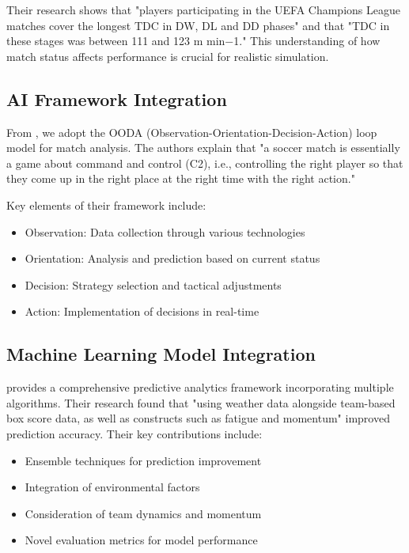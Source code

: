 \documentclass[10pt,journal,compsoc]{IEEEtran}
\begin{document}
Their research shows that "players participating in the UEFA Champions League matches cover the longest TDC in DW, DL and DD phases" and that "TDC in these stages was between 111 and 123 m min−1." This understanding of how match status affects performance is crucial for realistic simulation. 

\subsection{AI Framework Integration}
From \cite{pu2024orientation}, we adopt the OODA (Observation-Orientation-Decision-Action) loop model for match analysis. The authors explain that "a soccer match is essentially a game about command and control (C2), i.e., controlling the right player so that they come up in the right place at the right time with the right action."

Key elements of their framework include:
\begin{itemize}
    \item Observation: Data collection through various technologies
    \item Orientation: Analysis and prediction based on current status
    \item Decision: Strategy selection and tactical adjustments
    \item Action: Implementation of decisions in real-time
\end{itemize}

\subsection{Machine Learning Model Integration}
\cite{wong2025predictive} provides a comprehensive predictive analytics framework incorporating multiple algorithms. Their research found that "using weather data alongside team-based box score data, as well as constructs such as fatigue and momentum" improved prediction accuracy. Their key contributions include:

\begin{itemize}
    \item Ensemble techniques for prediction improvement
    \item Integration of environmental factors
    \item Consideration of team dynamics and momentum
    \item Novel evaluation metrics for model performance
\end{itemize}
\end{document}
